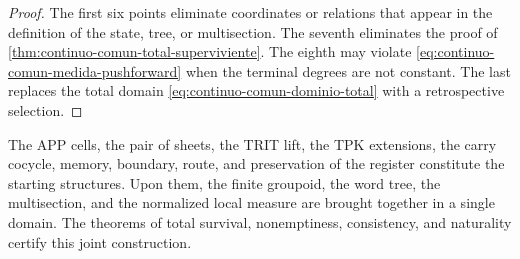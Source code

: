 \begin{proof}
The first six points eliminate coordinates or relations that appear in the
definition of the state, tree, or multisection. The seventh eliminates the proof of
\cref{thm:continuo-comun-total-superviviente}. The eighth may violate
\eqref{eq:continuo-comun-medida-pushforward} when the terminal degrees are not
constant. The last replaces the total domain
\eqref{eq:continuo-comun-dominio-total} with a retrospective selection.
\end{proof}

The APP cells, the pair of sheets, the TRIT lift, the TPK extensions,
the carry cocycle, memory, boundary, route, and preservation of the
register constitute the starting structures. Upon them, the finite groupoid,
the word tree, the multisection, and the normalized local measure are brought
together in a single domain. The theorems of total survival, nonemptiness,
consistency, and naturality certify this joint construction.
